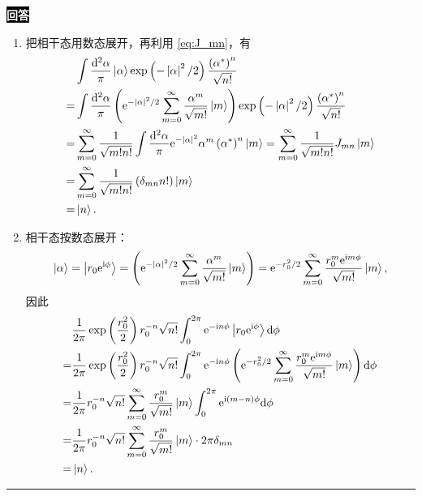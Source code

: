 \documentclass[11pt,a4paper]{ctexart}
\newenvironment{answer}
  {\par\smallskip\noindent
   \begingroup
   \setlength{\fboxsep}{4pt}%
   \colorbox{black}{\textcolor{white}{\bfseries 回答}}%
   \endgroup
   \quad\ignorespaces}
  {\par\smallskip\noindent\rule{\linewidth}{0.4pt}\medskip}
\begin{document}
\begin{answer}
  \begin{enumerate}
    \item 把相干态用数态展开，再利用 \eqref{eq:J_mn}，有
    \begin{equation}
      \begin{aligned}
        &\int\frac{\mathrm{d}^2\alpha}{\pi}\Ket{\alpha}\exp\left(-\left|\alpha\right|^2/2\right)\frac{\left(\alpha^*\right)^n}{\sqrt{n!}} \\
        =&\int\frac{\mathrm{d}^2\alpha}{\pi}\left(\mathrm{e}^{-\left|\alpha \right|^2/2} \sum_{m=0}^{\infty} \frac{\alpha^m }{\sqrt{m!} } \Ket{m }  \right)\exp\left(-\left|\alpha\right|^2/2\right)\frac{\left(\alpha^*\right)^n}{\sqrt{n!}} \\
        =&\sum_{m=0}^{\infty} \frac{1 }{\sqrt{m!n!} } \int \frac{\mathrm{d}^2\alpha }{\pi } \mathrm{e}^{-\left|\alpha \right|^2} \alpha^m \left(\alpha^* \right)^n \Ket{m }
        =\sum_{m=0}^{\infty} \frac{1 }{\sqrt{m!n!} } J_{mn} \Ket{m } \\
        =&\sum_{m=0}^{\infty} \frac{1 }{\sqrt{m!n!} } \left(\delta_{mn} n! \right) \Ket{m } \\
        =&\Ket{n }.
      \end{aligned}
    \end{equation}
    \item 相干态按数态展开：
    \begin{equation}
      \Ket{\alpha }
      =\Ket{r_0\mathrm{e}^{\mathrm{i}\phi} }
      =\left(\mathrm{e}^{-\left|\alpha \right|^2/2} \sum_{m=0}^{\infty} \frac{\alpha^m }{\sqrt{m!} } \Ket{m }  \right)
      =\mathrm{e}^{-r_0^2/2} \sum_{m=0}^{\infty} \frac{r_0^m \mathrm{e}^{\mathrm{i}m\phi} }{\sqrt{m!} } \Ket{m },
    \end{equation}
    因此
    \begin{equation}
      \begin{aligned}
        &\frac{1}{2\pi}\exp\left(\frac{r_0^2}{2}\right)r_0^{-n}\sqrt{n!}\int_0^{2\pi}\mathrm{e}^{-\mathrm{i}n\phi}\Ket{r_0\mathrm{e}^{\mathrm{i}\phi}}\mathrm{d}\phi \\
        =&\frac{1}{2\pi}\exp\left(\frac{r_0^2}{2}\right)r_0^{-n}\sqrt{n!}\int_0^{2\pi}\mathrm{e}^{-\mathrm{i}n\phi} \left(\mathrm{e}^{-r_0^2/2} \sum_{m=0}^{\infty} \frac{r_0^m \mathrm{e}^{\mathrm{i}m\phi} }{\sqrt{m!} } \Ket{m } \right) \mathrm{d}\phi \\
        =&\frac{1}{2\pi}r_0^{-n}\sqrt{n!}\sum_{m=0}^{\infty} \frac{r_0^m }{\sqrt{m!} } \Ket{m } \int_0^{2\pi}\mathrm{e}^{\mathrm{i}\left(m-n \right)\phi}  \mathrm{d}\phi \\
        =&\frac{1}{2\pi}r_0^{-n}\sqrt{n!}\sum_{m=0}^{\infty} \frac{r_0^m }{\sqrt{m!} } \Ket{m } \cdot 2\pi\delta_{mn} \\
        =&\Ket{n }.
      \end{aligned}
    \end{equation}
  \end{enumerate}
\end{answer}
\end{document}
